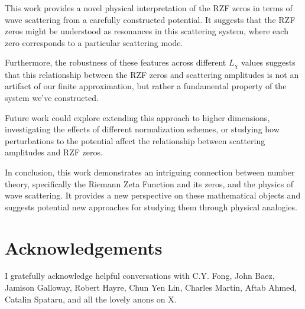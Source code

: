 \documentclass[11pt, oneside]{article}
\begin{document}
This work provides a novel physical interpretation of the RZF zeros in terms of wave scattering from a carefully constructed potential. It suggests that the RZF zeros might be understood as resonances in this scattering system, where each zero corresponds to a particular scattering mode.

Furthermore, the robustness of these features across different $L_\chi$ values suggests that this relationship between the RZF zeros and scattering amplitudes is not an artifact of our finite approximation, but rather a fundamental property of the system we've constructed.

Future work could explore extending this approach to higher dimensions, investigating the effects of different normalization schemes, or studying how perturbations to the potential affect the relationship between scattering amplitudes and RZF zeros.

In conclusion, this work demonstrates an intriguing connection between number theory, specifically the Riemann Zeta Function and its zeros, and the physics of wave scattering. It provides a new perspective on these mathematical objects and suggests potential new approaches for studying them through physical analogies.

\section{Acknowledgements}
I gratefully acknowledge helpful conversations with C.Y. Fong, John Baez, Jamison Galloway, Robert Hayre, Chun Yen Lin, Charles Martin, Aftab Ahmed, Catalin Spataru, and all the lovely anons on X.

\printbibliography
\end{document}
